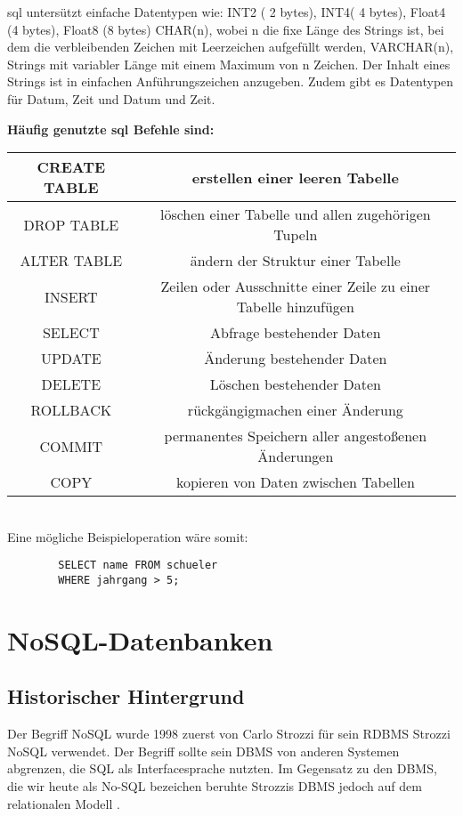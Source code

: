 \documentclass[12pt, a4paper, twoside]{article}
\begin{document}
		\ac{sql} untersützt einfache Datentypen wie: INT2 ( 2 bytes), INT4( 4 bytes), Float4 (4 bytes), Float8 (8 bytes) CHAR(n), wobei n die fixe Länge des Strings ist, bei dem die verbleibenden Zeichen mit Leerzeichen aufgefüllt werden, VARCHAR(n), Strings mit variabler Länge mit einem Maximum von n Zeichen. Der Inhalt eines Strings ist in einfachen Anführungszeichen anzugeben.
		Zudem gibt es Datentypen für Datum, Zeit und Datum und Zeit.
		
		\textbf{Häufig genutzte \ac{sql} Befehle sind:}
		
		\begin{tabular}{|c|c|}
			\hline
			CREATE TABLE & erstellen einer leeren Tabelle  \\
			\hline
			DROP TABLE&  löschen einer Tabelle und allen zugehörigen Tupeln\\
			\hline
			ALTER TABLE& ändern der Struktur einer Tabelle \\
			\hline
			INSERT&  Zeilen oder Ausschnitte einer Zeile zu einer Tabelle hinzufügen\\
			\hline
			SELECT&  Abfrage bestehender Daten\\
			\hline
			UPDATE& Änderung bestehender Daten \\
			\hline
			DELETE&  Löschen bestehender Daten\\
			\hline
			ROLLBACK&  rückgängigmachen einer Änderung\\
			\hline
			COMMIT&  permanentes Speichern aller angestoßenen Änderungen\\
			\hline
			COPY&  kopieren von Daten zwischen Tabellen\\
			\hline
		\end{tabular}
	\\
	
	Eine mögliche Beispieloperation wäre somit:
	\begin{verbatim}
		SELECT name FROM schueler 
		WHERE jahrgang > 5; 
	\end{verbatim}
		
		
\section{NoSQL-Datenbanken}

	\subsection{Historischer Hintergrund}
	Der Begriff NoSQL wurde 1998 zuerst von Carlo Strozzi für sein \ac{RDBMS} Strozzi NoSQL verwendet. Der Begriff sollte sein \ac{DBMS} von anderen Systemen abgrenzen, die SQL als Interfacesprache nutzten. Im Gegensatz zu den \ac{DBMS}, die wir heute als No-SQL bezeichen beruhte Strozzis \ac{DBMS} jedoch auf dem relationalen Modell \cite{strozziNoSQL}.
	
\end{document}
